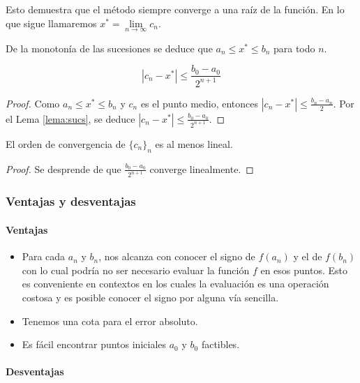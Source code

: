 Esto demuestra que el método siempre converge a una raíz de la función. En lo que sigue llamaremos $x^* = \lim\limits_{n \to \infty} c_n$.

\begin{obs}
De la monotonía de las sucesiones se deduce que $a_n \leq x^* \leq b_n$ para todo $n$.
\end{obs}

\begin{propo}
\[|c_n - x^*| \leq \frac{b_0 - a_0}{2^{n + 1}}\]

\begin{proof}
Como $a_n \leq x^* \leq b_n$ y $c_n$ es el punto medio, entonces $|c_n - x^*| \leq \frac{b_n - a_n}{2}$. Por el Lema \ref{lema:sucs}, se deduce $|c_n - x^*| \leq \frac{b_0 - a_0}{2^{n + 1}}$.
\end{proof}
\end{propo}

\begin{coro}
El orden de convergencia de $\{c_n\}_n$ es al menos lineal.

\begin{proof}
Se desprende de que $\frac{b_0 - a_0}{2^{n + 1}}$ converge linealmente.
\end{proof}
\end{coro}

\subsubsection{Ventajas y desventajas}

\paragraph{Ventajas}

\begin{itemize}
	\item Para cada $a_n$ y $b_n$, nos alcanza con conocer el signo de $f(a_n)$ y el de $f(b_n)$ con lo cual podría no ser necesario evaluar la función $f$ en esos puntos. Esto es conveniente en contextos en los cuales la evaluación es una operación costosa y es posible conocer el signo por alguna vía sencilla.
	\item Tenemos una cota para el error absoluto.
	\item Es fácil encontrar puntos iniciales $a_0$ y $b_0$ factibles.
\end{itemize}

\paragraph{Desventajas}

